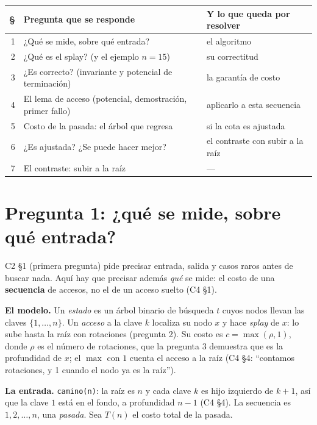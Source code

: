 \documentclass[11pt]{article}
\begin{document}
\begin{center}\small
\begin{tabular}{@{}rll@{}}
\toprule
\textbf{§} & \textbf{Pregunta que se responde} & \textbf{Y lo que queda por resolver}\\
\midrule
1 & ¿Qué se mide, sobre qué entrada? & el algoritmo\\
2 & ¿Qué es el splay? (y el ejemplo $n=15$) & su correctitud\\
3 & ¿Es correcto? (invariante y potencial de terminación) & la garantía de costo\\
4 & El lema de acceso (potencial, demostración, primer fallo) & aplicarlo a esta secuencia\\
5 & Costo de la pasada: el árbol que regresa & si la cota es ajustada\\
6 & ¿Es ajustada? ¿Se puede hacer mejor? & el contraste con subir a la raíz\\
7 & El contraste: subir a la raíz & ---\\
\bottomrule
\end{tabular}
\end{center}

\section{Pregunta 1: ¿qué se mide, sobre qué entrada?}

C2 §1 (primera pregunta) pide precisar entrada, salida y casos raros antes de buscar nada. Aquí hay que precisar además \emph{qué} se
mide: el costo de una \textbf{secuencia} de accesos, no el de un acceso suelto (C4 §1).

\textbf{El modelo.} Un \emph{estado} es un árbol binario de búsqueda $t$ cuyos nodos llevan las claves
$\{1,\dots,n\}$. Un \emph{acceso} a la clave $k$ localiza su nodo $x$ y hace \emph{splay} de $x$: lo sube hasta la
raíz con rotaciones (pregunta 2). Su costo es $c=\max(\rho,1)$, donde $\rho$ es el número de rotaciones, que la
pregunta 3 demuestra que es la profundidad de $x$; el $\max$ con $1$ cuenta el acceso a la raíz (C4 §4: ``contamos
rotaciones, y 1 cuando el nodo ya es la raíz'').

\textbf{La entrada.} \texttt{camino(n)}: la raíz es $n$ y cada clave $k$ es hijo izquierdo de $k+1$, así que la
clave $1$ está en el fondo, a profundidad $n-1$ (C4 §4). La secuencia es $1,2,\dots,n$, una \emph{pasada}. Sea
$T(n)$ el costo total de la pasada.
\end{document}
